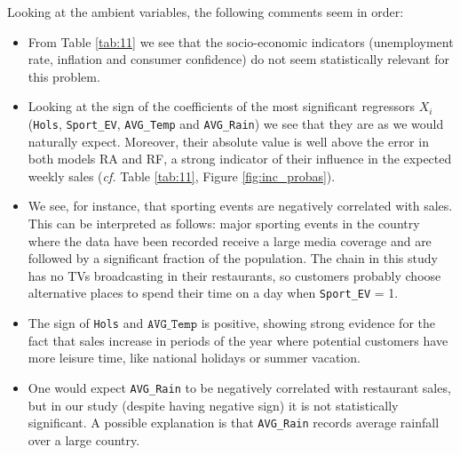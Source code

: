 
Looking at the ambient variables, the following comments seem in order:
\begin{itemize}

\item From Table \ref{tab:11} we see that the socio-economic indicators (unemployment rate, inflation and consumer confidence) do not seem statistically relevant for this problem. 

\item Looking at the sign of the coefficients of the most significant regressors $X_i$ (\texttt{Hols}, \texttt{Sport\_EV}, \texttt{AVG\_Temp} and \texttt{AVG\_Rain}) we see that they are as we would naturally expect. Moreover, their absolute value is well above the error in both models RA and RF, a strong indicator of their influence in the expected weekly sales (\emph{cf.} Table \ref{tab:11}, Figure \ref{fig:inc_probas}). 

\item We see, for instance, that sporting events are negatively correlated with sales. This can be interpreted as follows: major sporting events in the country where the data have been recorded receive a large media coverage and are followed by a significant fraction of the population. The chain in this study has no TVs broadcasting in their restaurants, so customers probably choose alternative places to spend their time on a day when \texttt{Sport\_EV} = 1. 

\item The sign of \texttt{Hols} and $\texttt{AVG\_Temp}$ is positive, showing strong evidence for the fact that sales increase in periods of the year where potential customers have more leisure time, like national holidays or  summer vacation. 

\item One would expect \texttt{AVG\_Rain} to be negatively correlated with restaurant sales, but in our study (despite having negative sign) it is not statistically significant. A possible explanation is that \texttt{AVG\_Rain} records average rainfall over a large country. %

\end{itemize}

